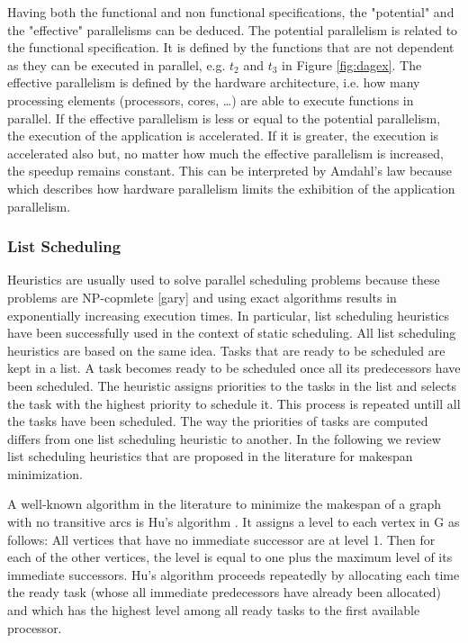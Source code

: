 Having both the functional and non functional specifications, the "potential" and the "effective" parallelisms can be deduced. The potential parallelism is related to the functional specification. It is defined by the functions that are not dependent as they can be executed in parallel, e.g. $t_2$ and $t_3$ in Figure \ref{fig:dagex}. The effective parallelism is defined by the hardware architecture, i.e. how many processing elements (processors, cores, \ldots) are able to execute functions in parallel. If the effective parallelism is less or equal to the potential parallelism, the execution of the application is accelerated. If it is greater, the execution is accelerated also but, no matter how much the effective parallelism is increased, the speedup remains constant. This can be interpreted by Amdahl's law because which describes how hardware parallelism limits the exhibition of the application parallelism.


\subsubsection{List Scheduling}

Heuristics are usually used to solve parallel scheduling problems because these problems are NP-copmlete [gary] and using exact algorithms results in exponentially increasing execution times. In particular, list scheduling heuristics have been successfully used in the context of static scheduling. All list scheduling heuristics are based on the same idea. Tasks that are ready to be scheduled are kept in a list. A task becomes ready to be scheduled once all its predecessors have been scheduled. The heuristic assigns priorities to the tasks in the list and selects the task with the highest priority to schedule it. This process is repeated untill all the tasks have been scheduled. The way the priorities of tasks are computed differs from one list scheduling heuristic to another. In the following we review list scheduling heuristics that are proposed in the literature for makespan minimization.

A well-known algorithm in the literature to minimize the makespan of a graph with no transitive arcs is Hu's algorithm \cite{hu:1961}. It assigns a level to each vertex in G as follows: All vertices that have no immediate successor are at level 1. Then for each of the other vertices, the level is equal to one plus the maximum level of its immediate successors. Hu's algorithm proceeds repeatedly by allocating each time the ready task (whose all immediate predecessors have already been allocated) and which has the highest level among all ready tasks to the first available processor. 

